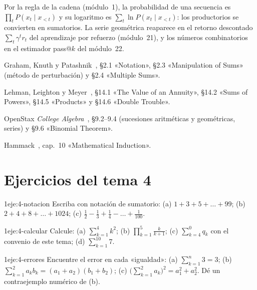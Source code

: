 \begin{observacion}
Por la regla de la cadena (módulo~1), la probabilidad de una secuencia es $\prod_tP(x_t\mid x_{<t})$ y su logaritmo es $\sum_t\ln P(x_t\mid x_{<t})$: los productorios se convierten en sumatorios. La serie geométrica reaparece en el retorno descontado $\sum_t\gamma^tr_t$ del aprendizaje por refuerzo (módulo~21), y los números combinatorios en el estimador pass@$k$ del módulo~22.
\end{observacion}

\begin{lecturas}
\item Graham, Knuth y Patashnik~\cite{gkp}, §2.1 «Notation», §2.3 «Manipulation of Sums» (método de perturbación) y §2.4 «Multiple Sums».
\item Lehman, Leighton y Meyer~\cite{mcs}, §14.1 «The Value of an Annuity», §14.2 «Sums of Powers», §14.5 «Products» y §14.6 «Double Trouble».
\item OpenStax \emph{College Algebra}~\cite{openstax}, §9.2--9.4 (sucesiones aritméticas y geométricas, series) y §9.6 «Binomial Theorem».
\item Hammack~\cite{hammack}, cap.~10 «Mathematical Induction».
\end{lecturas}

\section*{Ejercicios del tema 4}

\begin{ejercicio}{1}{eje:4-notacion}
Escriba con notación de sumatorio: (a) $1+3+5+\dots+99$; (b) $2+4+8+\dots+1024$; (c) $\frac12-\frac13+\frac14-\dots+\frac1{100}$.
\end{ejercicio}

\begin{ejercicio}{1}{eje:4-calcular}
Calcule: (a) $\sum_{k=1}^4k^2$; (b) $\prod_{k=1}^5\frac k{k+1}$; (c) $\sum_{k=4}^{0}q_k$ con el convenio de este tema; (d) $\sum_{k=1}^{10}7$.
\end{ejercicio}

\begin{ejercicio}{1}{eje:4-errores}
Encuentre el error en cada «igualdad»: (a) $\sum_{k=1}^n3=3$; (b) $\sum_{k=1}^2a_kb_k=(a_1+a_2)(b_1+b_2)$; (c) $\bigl(\sum_{k=1}^2a_k\bigr)^2=a_1^2+a_2^2$. Dé un contraejemplo numérico de (b).
\end{ejercicio}

